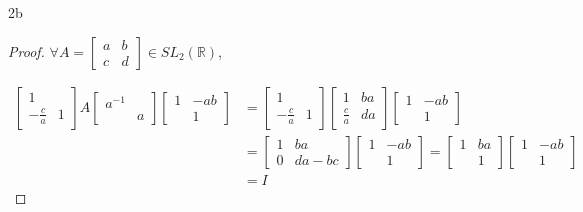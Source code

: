\documentclass{article}
\newcommand{\R}{\mathbb{R}}
\begin{document}
\begin{PROB}{2b}\label{Problem 2b.}
    
\end{PROB}
\begin{proof}
    $\forall A = \begin{bmatrix}
        a & b \\ c & d
    \end{bmatrix} \in SL_2(\R)$, 
    
    \begin{align*}
        \begin{bmatrix}
            1 \\ -\frac{c}{a} & 1
        \end{bmatrix} A \begin{bmatrix}
            a^{-1} \\ & a
        \end{bmatrix} \begin{bmatrix}
            1 & -ab \\ & 1
        \end{bmatrix} &= \begin{bmatrix}
            1 \\ -\frac{c}{a} & 1
        \end{bmatrix} \begin{bmatrix}
            1 & ba \\ \frac{c}{a} & da
        \end{bmatrix} \begin{bmatrix}
            1 & -ab \\ & 1
        \end{bmatrix}\\ 
        &= \begin{bmatrix}
            1 & ba \\ 0 & da - bc
        \end{bmatrix} \begin{bmatrix}
            1 & -ab \\ & 1
        \end{bmatrix} = \begin{bmatrix}
            1 & ba\\ & 1
        \end{bmatrix}\begin{bmatrix}
            1 & -ab \\ & 1
        \end{bmatrix} \\
        &= I
    \end{align*} 


\end{proof}
\end{document}
